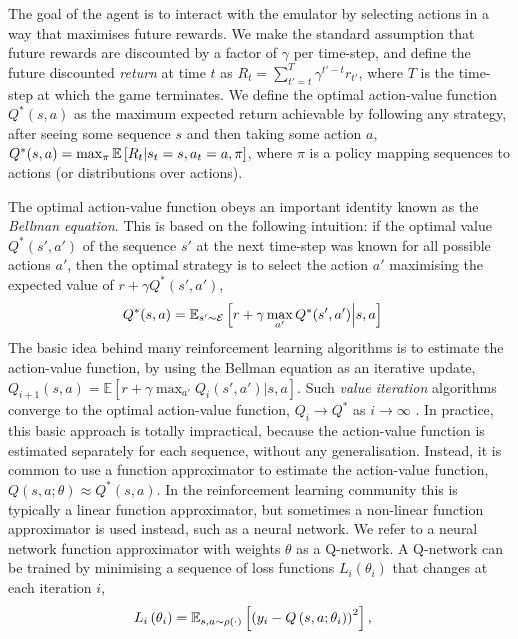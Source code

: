 \documentclass{article} \usepackage{nips13submit_e,times}
\begin{document}
The goal of the agent is to interact with the emulator by selecting actions in a way that maximises future rewards. We make the standard assumption that future rewards are discounted by a factor of $\gamma$ per time-step, and define the future discounted \emph{return} at time $t$ as $R_t = \sum_{t'=t}^{T} \gamma^{t'-t} r_{t'}$, where $T$
is the time-step at which the game terminates. We define the optimal action-value function $Q^*(s,a)$ as the maximum expected return achievable by following any strategy, after seeing some sequence $s$ and then taking some action $a$, $Q^*(s,a) = \max_{\pi} \mathbb{E} \left[  R_t | s_t=s, a_t=a, \pi  \right]$, where $\pi$ is a policy mapping sequences to actions (or distributions over actions).

The optimal action-value function obeys an important identity known as the \emph{Bellman equation}. This is based on the following intuition: if the optimal value $Q^*(s',a')$ of the sequence $s'$ at the next time-step was known for all possible actions $a'$, then the optimal strategy is to select the action $a'$ maximising the expected value of $r + \gamma Q^*(s',a')$,
\begin{align}
Q^*(s,a) &= \mathbb{E}_{s' \sim \mathcal{E}} \left[  r + \gamma \max_{a'} Q^*(s', a') \Big| s, a  \right]
\end{align}
The basic idea behind many reinforcement learning algorithms is to estimate the action-value function, by using the Bellman equation as an iterative update, $Q_{i+1}(s,a) = \mathbb{E}\left[ r + \gamma \max_{a'} Q_i(s', a') | s, a \right]$. Such \emph{value iteration} algorithms converge to the optimal action-value function, $Q_i \rightarrow Q^*$ as $i \rightarrow \infty$ \cite{sutton:book}. In practice, this basic approach is totally impractical, because the action-value function is estimated separately for each sequence, without any generalisation. Instead, it is common to use a function approximator to estimate the action-value function, $Q(s,a; \theta) \approx Q^*(s,a)$. In the reinforcement learning community this is typically a linear function approximator, but sometimes a non-linear function approximator is used instead, such as a neural network. We refer to a neural network function approximator with weights $\theta$ as a Q-network. A Q-network can be trained by minimising a sequence of loss functions $L_i(\theta_i)$ that changes at each iteration $i$,
\begin{align}
L_i\left(\theta_i\right) &= \mathbb{E}_{s,a \sim \rho(\cdot)} \left[ \left(y_i - Q \left(s,a ; \theta_i \right) \right)^2 \right],
\label{eq:q-learning-loss}
\end{align}
\end{document}
